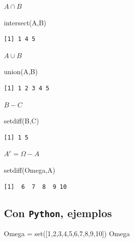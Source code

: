 \documentclass[
  letterpaper,
  DIV=11,
  numbers=noendperiod]{scrreprt}
\newenvironment{Shaded}{\begin{snugshade}}{\end{snugshade}}
\newcommand{\BuiltInTok}[1]{\textcolor[rgb]{0.00,0.23,0.31}{#1}}
\newcommand{\DecValTok}[1]{\textcolor[rgb]{0.68,0.00,0.00}{#1}}
\newcommand{\FunctionTok}[1]{\textcolor[rgb]{0.28,0.35,0.67}{#1}}
\newcommand{\NormalTok}[1]{\textcolor[rgb]{0.00,0.23,0.31}{#1}}
\newcommand{\OperatorTok}[1]{\textcolor[rgb]{0.37,0.37,0.37}{#1}}
\begin{document}
\(A\cap B\)

\begin{Shaded}
\begin{Highlighting}[]
\FunctionTok{intersect}\NormalTok{(A,B)}
\end{Highlighting}
\end{Shaded}

\begin{verbatim}
[1] 1 4 5
\end{verbatim}

\(A\cup B\)

\begin{Shaded}
\begin{Highlighting}[]
\FunctionTok{union}\NormalTok{(A,B)}
\end{Highlighting}
\end{Shaded}

\begin{verbatim}
[1] 1 2 3 4 5
\end{verbatim}

\(B-C\)

\begin{Shaded}
\begin{Highlighting}[]
\FunctionTok{setdiff}\NormalTok{(B,C)}
\end{Highlighting}
\end{Shaded}

\begin{verbatim}
[1] 1 5
\end{verbatim}

\(A^c=\Omega-A\)

\begin{Shaded}
\begin{Highlighting}[]
\FunctionTok{setdiff}\NormalTok{(Omega,A)}
\end{Highlighting}
\end{Shaded}

\begin{verbatim}
[1]  6  7  8  9 10
\end{verbatim}

\hypertarget{con-python-ejemplos}{%
\subsection{\texorpdfstring{Con \texttt{Python},
ejemplos}{Con Python, ejemplos}}\label{con-python-ejemplos}}

\begin{Shaded}
\begin{Highlighting}[]
\NormalTok{Omega }\OperatorTok{=} \BuiltInTok{set}\NormalTok{([}\DecValTok{1}\NormalTok{,}\DecValTok{2}\NormalTok{,}\DecValTok{3}\NormalTok{,}\DecValTok{4}\NormalTok{,}\DecValTok{5}\NormalTok{,}\DecValTok{6}\NormalTok{,}\DecValTok{7}\NormalTok{,}\DecValTok{8}\NormalTok{,}\DecValTok{9}\NormalTok{,}\DecValTok{10}\NormalTok{])}
\NormalTok{Omega}
\end{Highlighting}
\end{Shaded}
\end{document}
